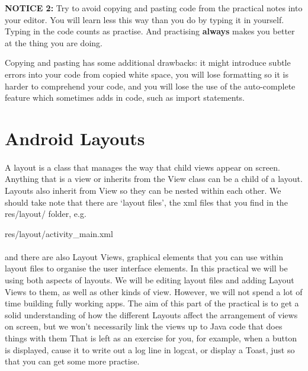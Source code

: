 \documentclass[12pt, a4paper, twoside]{book}
\begin{document}
\begin{framed}
{\bf{NOTICE 2:}} Try to avoid copying and pasting code from the practical notes into your editor. You will learn less this way than you do by typing it in yourself. Typing in the code counts as practise. And practising {\bf{always}} makes you better at the thing you are doing.

Copying and pasting has some additional drawbacks: it might introduce subtle errors into your code from copied white space, you will lose formatting so it is harder to comprehend your code, and you will lose the use of the auto-complete feature which sometimes adds in code, such as import statements.
\end{framed}

\section{Android Layouts}
\paragraph{} A layout is a class that manages the way that child views appear on screen. Anything that is a view or inherits from the View class can be a child of a layout. Layouts also inherit from View so they can be nested within each other. We should take note that there are `layout files', the xml files that you find in the res/layout/ folder, e.g.

\begin{framed}
res/layout/activity\_main.xml
\end{framed}

\paragraph{} and there are also Layout Views, graphical elements that you can use within layout files to organise the user interface elements. In this practical we will be using both aspects of layouts. We will be editing layout files and adding Layout Views to them, as well as other kinds of view. However, we will not spend a lot of time building fully working apps. The aim of this part of the practical is to get a solid understanding of how the different Layouts affect the arrangement of views on screen, but we won't necessarily link the views up to Java code that does things with them That is left as an exercise for you, for example, when a button is displayed, cause it to write out a log line in logcat, or display a Toast, just so that you can get some more practise.
\end{document}
